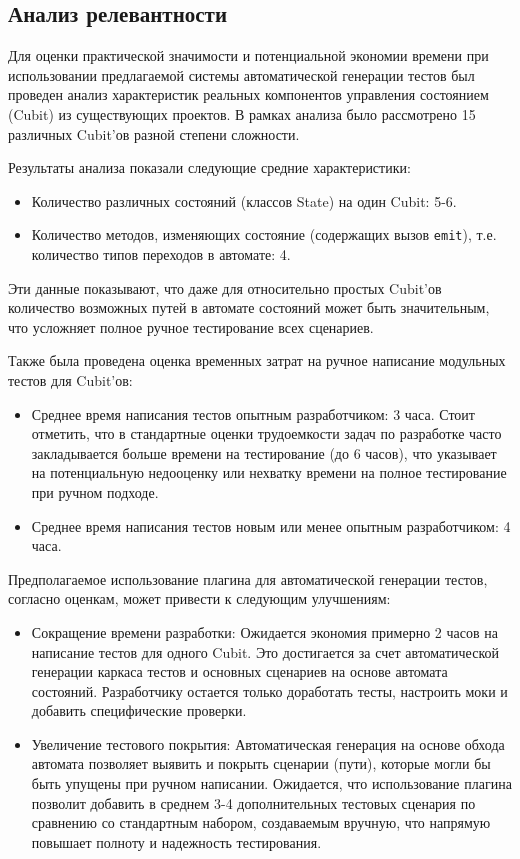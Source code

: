 \documentclass[14pt, russian]{scrartcl}
\begin{document}
\subsection{Анализ релевантности}

Для оценки практической значимости и потенциальной экономии времени при использовании предлагаемой системы автоматической генерации тестов был проведен анализ характеристик реальных компонентов управления состоянием (Cubit) из существующих проектов. В рамках анализа было рассмотрено 15 различных Cubit'ов разной степени сложности.

Результаты анализа показали следующие средние характеристики:
\begin{itemize}
    \item Количество различных состояний (классов State) на один Cubit: 5-6.
    \item Количество методов, изменяющих состояние (содержащих вызов \texttt{emit}), т.е. количество типов переходов в автомате: 4.
\end{itemize}

Эти данные показывают, что даже для относительно простых Cubit'ов количество возможных путей в автомате состояний может быть значительным, что усложняет полное ручное тестирование всех сценариев.

Также была проведена оценка временных затрат на ручное написание модульных тестов для Cubit'ов:
\begin{itemize}
    \item Среднее время написания тестов опытным разработчиком: 3 часа. Стоит отметить, что в стандартные оценки трудоемкости задач по разработке часто закладывается больше времени на тестирование (до 6 часов), что указывает на потенциальную недооценку или нехватку времени на полное тестирование при ручном подходе.
    \item Среднее время написания тестов новым или менее опытным разработчиком: 4 часа.
\end{itemize}

Предполагаемое использование плагина для автоматической генерации тестов, согласно оценкам, может привести к следующим улучшениям:
\begin{itemize}
    \item {Сокращение времени разработки:} Ожидается экономия примерно 2 часов на написание тестов для одного Cubit. Это достигается за счет автоматической генерации каркаса тестов и основных сценариев на основе автомата состояний. Разработчику остается только доработать тесты, настроить моки и добавить специфические проверки.
    \item {Увеличение тестового покрытия:} Автоматическая генерация на основе обхода автомата позволяет выявить и покрыть сценарии (пути), которые могли бы быть упущены при ручном написании. Ожидается, что использование плагина позволит добавить в среднем 3-4 дополнительных тестовых сценария по сравнению со стандартным набором, создаваемым вручную, что напрямую повышает полноту и надежность тестирования.
\end{itemize}
\end{document}
